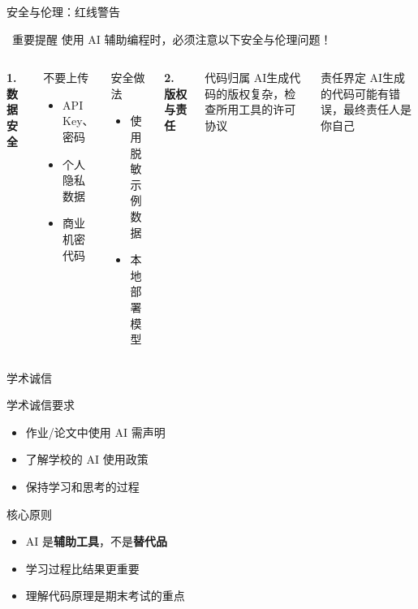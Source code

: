 \begin{frame}{安全与伦理：红线警告}
	\begin{alertblock}{\faExclamationTriangle\ 重要提醒}
		使用 AI 辅助编程时，必须注意以下安全与伦理问题！
	\end{alertblock}

	\vspace{0.3cm}

	\begin{columns}
		\textbf{1. 数据安全}

		\begin{block}{不要上传}
			\begin{itemize}
				\item API Key、密码
				\item 个人隐私数据
				\item 商业机密代码
			\end{itemize}
		\end{block}

		\begin{block}{安全做法}
			\begin{itemize}
				\item 使用脱敏示例数据
				\item 本地部署模型
			\end{itemize}
		\end{block}

		\textbf{2. 版权与责任}

		\begin{block}{代码归属}
			AI生成代码的版权复杂，检查所用工具的许可协议
		\end{block}

		\begin{block}{责任界定}
			AI生成的代码可能有错误，最终责任人是你自己
		\end{block}
	\end{columns}
\end{frame}

\begin{frame}{学术诚信}
	\begin{block}{学术诚信要求}
		\begin{itemize}
			\item 作业/论文中使用 AI 需声明
			\item 了解学校的 AI 使用政策
			\item 保持学习和思考的过程
		\end{itemize}
	\end{block}

	\vspace{0.3cm}

	\begin{alertblock}{核心原则}
		\begin{itemize}
			\item AI 是\textbf{辅助工具}，不是\textbf{替代品}
			\item 学习过程比结果更重要
			\item 理解代码原理是期末考试的重点
		\end{itemize}
	\end{alertblock}
\end{frame}
